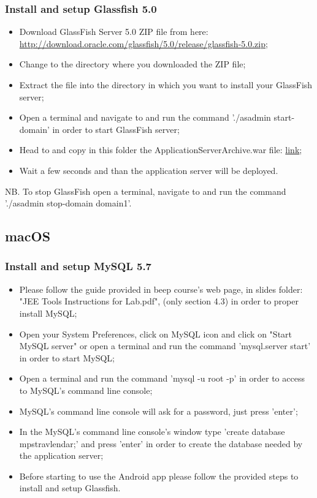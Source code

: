 \subsubsection{Install and setup Glassfish 5.0}
\begin{itemize}
	\item Download GlassFish Server 5.0 ZIP file from here: \\ \href{http://download.oracle.com/glassfish/5.0/release/glassfish-5.0.zip}{\color{blue}http://download.oracle.com/glassfish/5.0/release/glassfish-5.0.zip};
	\item Change to the directory where you downloaded the ZIP file;
	\item Extract the file into the directory in which you want to install your GlassFish server;
	\item Open a terminal and navigate to  and run the command './asadmin start-domain' in order to start GlassFish server;
	\item Head to  and copy in this folder the ApplicationServerArchive.war file: \href{https://github.com/JustSalva/MelziPinaSalvadore/tree/master/DeliveryFolder/InstallationFolder}{\color{blue}link};
	\item Wait a few seconds and than the application server will be deployed.
\end{itemize}
NB. To stop GlassFish open a terminal, navigate to  and run the command './asadmin stop-domain domain1'.

\subsection{macOS}
\label{subsect:macOS}

\subsubsection{Install and setup MySQL 5.7}
\begin{itemize}
	\item Please follow the guide provided in beep course's web page, in slides folder: "JEE Tools Instructions for Lab.pdf", (only section 4.3) in order to proper install MySQL;
	\item Open your System Preferences, click on MySQL icon and click on "Start MySQL server" or open a terminal and run the command 'mysql.server start' in order to start MySQL;
	\item Open a terminal and run the command 'mysql -u root -p' in order to access to MySQL's command line console;
	\item MySQL's command line console will ask for a password, just press 'enter';
	\item In the MySQL's command line console's window type 'create database mps\textunderscore travlendar;' and press 'enter' in order to create the database needed by the application server;
	\item Before starting to use the Android app please follow the provided steps to install and setup Glassfish.
\end{itemize}

